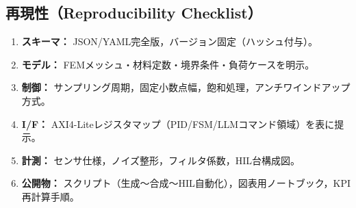 \subsection*{再現性（Reproducibility Checklist）}
\begin{enumerate}
  \item \textbf{スキーマ：} JSON/YAML完全版，バージョン固定（ハッシュ付与）。
  \item \textbf{モデル：} FEMメッシュ・材料定数・境界条件・負荷ケースを明示。
  \item \textbf{制御：} サンプリング周期，固定小数点幅，飽和処理，アンチワインドアップ方式。
  \item \textbf{I/F：} AXI4-Liteレジスタマップ（PID/FSM/LLMコマンド領域）を表に提示。
  \item \textbf{計測：} センサ仕様，ノイズ整形，フィルタ係数，HIL台構成図。
  \item \textbf{公開物：} スクリプト（生成～合成～HIL自動化），図表用ノートブック，KPI再計算手順。
\end{enumerate}
